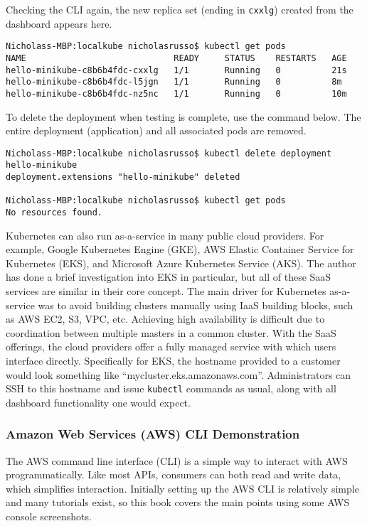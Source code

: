 Checking the CLI again, the new replica set (ending in \verb|cxxlg|) created
from the dashboard appears here.

\begin{verbatim}
Nicholass-MBP:localkube nicholasrusso$ kubectl get pods
NAME                             READY     STATUS    RESTARTS   AGE
hello-minikube-c8b6b4fdc-cxxlg   1/1       Running   0          21s
hello-minikube-c8b6b4fdc-l5jgn   1/1       Running   0          8m
hello-minikube-c8b6b4fdc-nz5nc   1/1       Running   0          10m
\end{verbatim}

To delete the deployment when testing is complete, use the command below. The
entire deployment (application) and all associated pods are removed.

\begin{verbatim}
Nicholass-MBP:localkube nicholasrusso$ kubectl delete deployment hello-minikube
deployment.extensions "hello-minikube" deleted

Nicholass-MBP:localkube nicholasrusso$ kubectl get pods
No resources found.
\end{verbatim}

Kubernetes can also run as-a-service in many public cloud providers. For
example, Google Kubernetes Engine (GKE), AWS Elastic Container Service for
Kubernetes (EKS), and Microsoft Azure Kubernetes Service (AKS). The author has
done a brief investigation into EKS in particular, but all of these SaaS
services are similar in their core concept. The main driver for Kubernetes
as-a-service was to avoid building clusters manually using IaaS building
blocks, such as AWS EC2, S3, VPC, etc. Achieving high availability is
difficult due to coordination between multiple masters in a common cluster.
With the SaaS offerings, the cloud providers offer a fully managed service
with which users interface directly. Specifically for EKS, the hostname
provided to a customer would look something like
``mycluster.eks.amazonaws.com''. Administrators can SSH to this hostname and
issue \verb|kubectl| commands as usual, along with all dashboard functionality
one would expect.

\subsubsection{Amazon Web Services (AWS) CLI Demonstration}
The AWS command line interface (CLI) is a simple way to interact with AWS
programmatically. Like most APIs, consumers can both read and write data,
which simplifies interaction. Initially setting up the AWS CLI is relatively
simple and many tutorials exist, so this book covers the main points using
some AWS console screenshots. \\

